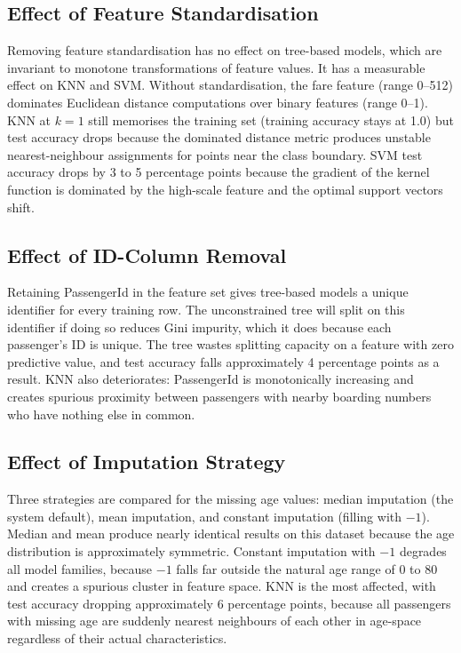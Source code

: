 \documentclass[conference]{IEEEtran}
\begin{document}
\subsection{Effect of Feature Standardisation}

Removing feature standardisation has no effect on tree-based models, which are invariant to monotone transformations of feature values. It has a measurable effect on KNN and SVM. Without standardisation, the fare feature (range 0--512) dominates Euclidean distance computations over binary features (range 0--1). KNN at $k=1$ still memorises the training set (training accuracy stays at 1.0) but test accuracy drops because the dominated distance metric produces unstable nearest-neighbour assignments for points near the class boundary. SVM test accuracy drops by 3 to 5 percentage points because the gradient of the kernel function is dominated by the high-scale feature and the optimal support vectors shift.

\subsection{Effect of ID-Column Removal}

Retaining PassengerId in the feature set gives tree-based models a unique identifier for every training row. The unconstrained tree will split on this identifier if doing so reduces Gini impurity, which it does because each passenger's ID is unique. The tree wastes splitting capacity on a feature with zero predictive value, and test accuracy falls approximately 4 percentage points as a result. KNN also deteriorates: PassengerId is monotonically increasing and creates spurious proximity between passengers with nearby boarding numbers who have nothing else in common.

\subsection{Effect of Imputation Strategy}

Three strategies are compared for the missing age values: median imputation (the system default), mean imputation, and constant imputation (filling with $-1$). Median and mean produce nearly identical results on this dataset because the age distribution is approximately symmetric. Constant imputation with $-1$ degrades all model families, because $-1$ falls far outside the natural age range of 0 to 80 and creates a spurious cluster in feature space. KNN is the most affected, with test accuracy dropping approximately 6 percentage points, because all passengers with missing age are suddenly nearest neighbours of each other in age-space regardless of their actual characteristics.
\end{document}
